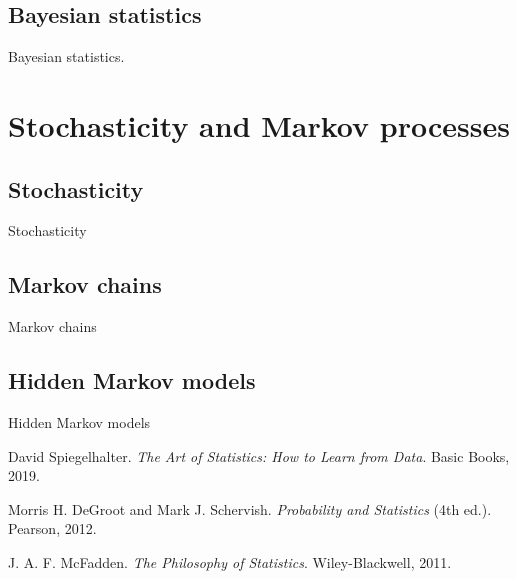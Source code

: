 \documentclass{book}
\begin{document}
\section{Bayesian statistics}
Bayesian statistics.


\chapter{Stochasticity and Markov processes}

\section{Stochasticity}
Stochasticity

\section{Markov chains}
Markov chains

\section{Hidden Markov models}
Hidden Markov models


\backmatter
 
\begin{thebibliography}{999}

David Spiegelhalter. 
\textit{The Art of Statistics: How to Learn from Data}. 
Basic Books, 2019.

Morris H. DeGroot and Mark J. Schervish.
\textit{Probability and Statistics} (4th ed.).
Pearson, 2012.

J. A. F. McFadden.
\textit{The Philosophy of Statistics}.
Wiley-Blackwell, 2011.

\end{thebibliography}
\end{document}
